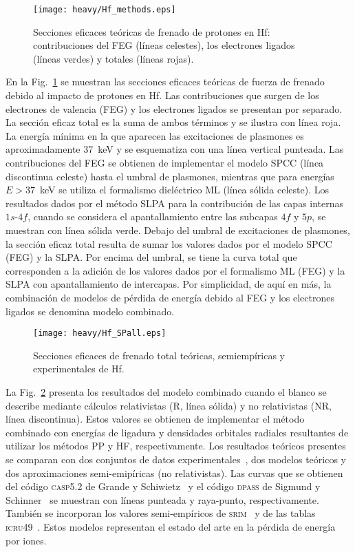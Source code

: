 \begin{figure}[t]
\centering
\texttt{[image: heavy/Hf\_methods.eps]}
\caption[Secciones eficaces teóricas de frenado de protones en Hf.]
{Secciones eficaces teóricas de frenado de protones en Hf: 
contribuciones del FEG (líneas celestes), los electrones ligados 
(líneas verdes) y totales (líneas rojas).} 
\label{fig:Hf_methods}
\end{figure}

En la Fig.~\ref{fig:Hf_methods} se muestran las secciones eficaces 
teóricas de fuerza de frenado debido al impacto de protones en Hf. 
Las contribuciones que surgen de los electrones de valencia (FEG) y los
electrones ligados se presentan por separado. La sección eficaz total es 
la suma de ambos términos y se ilustra con línea roja. La energía mínima 
en la que aparecen las excitaciones de plasmones es aproximadamente 
37~keV y se esquematiza con una línea vertical punteada. Las 
contribuciones del FEG se obtienen de implementar el modelo SPCC (línea 
discontinua celeste) hasta el umbral de plasmones, mientras que para 
energías $E>37$~keV se utiliza el formalismo dieléctrico ML (línea 
sólida celeste). Los resultados dados por el método SLPA para la 
contribución de las capas internas $1s$-$4f$, cuando se considera el 
apantallamiento entre las subcapas $4f$ y $5p$, se muestran con línea 
sólida verde. Debajo del umbral de excitaciones de plasmones, la sección 
eficaz total resulta de sumar los valores dados por el modelo SPCC (FEG) 
y la SLPA. Por encima del umbral, se tiene la curva total que 
corresponden a la adición de los valores dados por el formalismo ML 
(FEG) y la SLPA con apantallamiento de intercapas. Por simplicidad, de 
aquí en más, la combinación de modelos de pérdida de energía debido al 
FEG y los electrones ligados se denomina modelo combinado.

\begin{figure}[t]
\centering
\texttt{[image: heavy/Hf\_SPall.eps]}
\caption[Secciones eficaces teóricas, semiempíricas y experimentales de 
Hf.]{Secciones eficaces de frenado total teóricas, semiempíricas y
experimentales de Hf.}
\label{fig:Hf_SPall}
\end{figure}

La Fig.~\ref{fig:Hf_SPall} presenta los resultados del modelo combinado 
cuando el blanco se describe mediante cálculos relativistas (R, línea 
sólida) y no relativistas (NR, línea discontinua). Estos valores se 
obtienen de implementar el método combinado con energías de ligadura y 
densidades orbitales radiales resultantes de utilizar los métodos PP y 
HF, respectivamente. Los resultados teóricos presentes se comparan con 
dos conjuntos de datos experimentales~\cite{Montanari:20,Sirotinin:84},
dos modelos teóricos y dos aproximaciones semi-emipíricas (no 
relativistas). Las curvas que se obtienen del código \textsc{casp5.2} de 
Grande y Schiwietz~\cite{Grande:01,casp52} y el código \textsc{dpass} de 
Sigmund y Schinner~\cite{DPASS20} se muestran con líneas punteada y 
raya-punto, respectivamente. También se incorporan los valores 
semi-empíricos de \textsc{srim}~\cite{Ziegler01} y de las tablas 
\textsc{icru49}~\cite{ICRU49}. Estos modelos representan el estado del 
arte en la pérdida de energía por iones.

